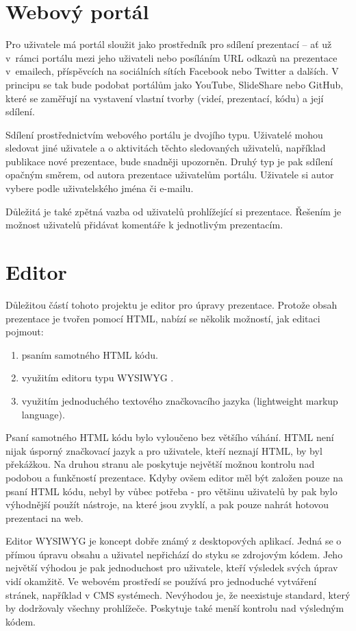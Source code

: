\documentclass[11pt,twoside,a4paper]{book}
\newcommand*{\nom}[2]{#1 \nomenclature{#1}{#2}} 			%
\begin{document}
\section{Webový portál}
Pro uživatele má portál sloužit jako prostředník pro sdílení prezentací – ať už v~rámci portálu mezi jeho uživateli nebo
posíláním URL odkazů na prezentace v~emailech, příspěvcích na sociálních sítích Facebook nebo Twitter a dalších. V principu se tak bude podobat portálům jako YouTube, SlideShare nebo GitHub, které se zaměřují na vystavení vlastní tvorby (videí, prezentací, kódu) a její sdílení.

Sdílení prostřednictvím webového portálu je dvojího typu. Uživatelé mohou sledovat jiné uživatele a o aktivitách těchto sledovaných uživatelů, například publikace nové prezentace, bude snadněji upozorněn. Druhý typ je pak sdílení opačným směrem, od autora prezentace uživatelům portálu. Uživatele si autor vybere podle uživatelského jména či e-mailu.

Důležitá je také zpětná vazba od uživatelů prohlížející si prezentace. Řešením je možnost uživatelů přidávat komentáře k jednotlivým prezentacím.

\section{Editor}
Důležitou částí tohoto projektu je editor pro úpravy prezentace. Protože obsah prezentace je tvořen pomocí HTML, nabízí se
několik možností, jak editaci pojmout:

\begin{enumerate}
	\item psaním samotného HTML kódu.
	\item využitím editoru typu \nom{WYSIWYG}{What You See Is What You Get}.
	\item využitím jednoduchého textového značkovacího jazyka (lightweight markup language).
\end{enumerate}

Psaní samotného HTML kódu bylo vyloučeno bez většího váhání. HTML není nijak úsporný značkovací jazyk a pro uživatele, kteří neznají HTML, by byl překážkou. Na druhou stranu ale poskytuje největší možnou kontrolu nad podobou a funkčností prezentace. Kdyby ovšem editor měl být založen pouze na psaní HTML kódu, nebyl by vůbec potřeba - pro většinu uživatelů by pak bylo výhodnější použít nástroje, na které jsou zvyklí, a pak pouze nahrát hotovou prezentaci na web.

Editor WYSIWYG je koncept dobře známý z desktopových aplikací. Jedná se o přímou úpravu obsahu a uživatel nepřichází do styku se zdrojovým kódem. Jeho největší výhodou je pak jednoduchost pro uživatele, kteří výsledek svých úprav vidí okamžitě. Ve webovém prostředí se používá pro jednoduché vytváření stránek, například v CMS systémech. Nevýhodou je, že neexistuje standard, který by dodržovaly všechny prohlížeče. Poskytuje také menší kontrolu nad výsledným kódem. 
\end{document}
